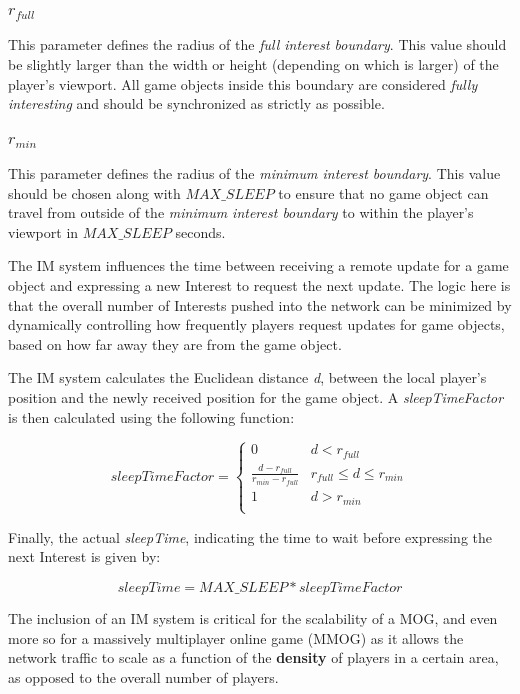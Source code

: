 \subsubsection{$r_{full}$} This parameter defines the radius of the \textit{full interest boundary}. This value should be slightly larger than the width or height (depending on which is larger) of the player's viewport. All game objects inside this boundary are considered \textit{fully interesting} and should be synchronized as strictly as possible.

\subsubsection{$r_{min}$} This parameter defines the radius of the \textit{minimum interest boundary}. This value should be chosen along with $MAX\_SLEEP$ to ensure that no game object can travel from outside of the \textit{minimum interest boundary} to within the player's viewport in $MAX\_SLEEP$ seconds. 

    
The IM system influences the time between receiving a remote update for a game object and expressing a new Interest to request the next update. The logic here is that the overall number of Interests pushed into the network can be minimized by dynamically controlling how frequently players request updates for game objects, based on how far away they are from the game object.

The IM system calculates the Euclidean distance \textit{d}, between the local player's position and the newly received position for the game object. A \textit{sleepTimeFactor} is then calculated using the following function:


\begin{equation}
sleepTimeFactor =
\begin{cases} 
    0 & d < r_{full} \\
    \frac{d - r_{full}}{r_{min} - r_{full}} & r_{full} \leq d \leq r_{min} \\
    1 & d > r_{min} \\
\end{cases}
\end{equation}

Finally, the actual \textit{sleepTime}, indicating the time to wait before expressing the next Interest is given by:

\begin{equation}
    sleepTime = MAX\_SLEEP * sleepTimeFactor
\end{equation}

The inclusion of an IM system is critical for the scalability of a MOG, and even more so for a massively multiplayer online game (MMOG) as it allows the network traffic to scale as a function of the \textbf{density} of players in a certain area, as opposed to the overall number of players.
